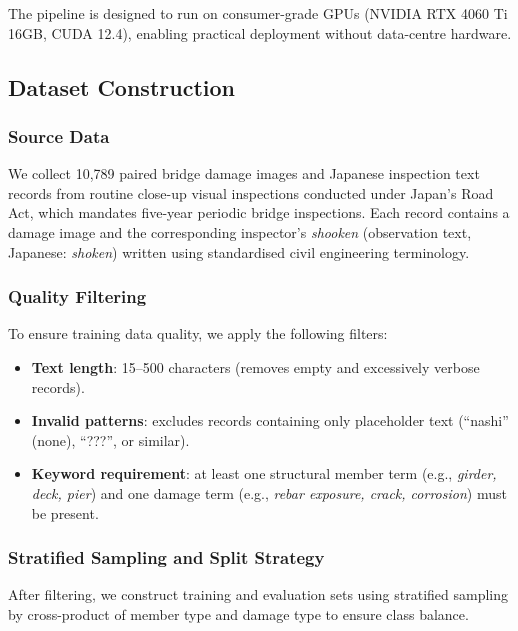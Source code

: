 \documentclass[twocolumn]{article}
\begin{document}
The pipeline is designed to run on consumer-grade GPUs (NVIDIA RTX 4060 Ti 16GB,
CUDA 12.4), enabling practical deployment without data-centre hardware.

\subsection{Dataset Construction}
\label{sec:dataset}

\subsubsection{Source Data}

We collect 10{,}789 paired bridge damage images and Japanese inspection text
records from routine close-up visual inspections conducted under Japan's Road
Act, which mandates five-year periodic bridge inspections.
Each record contains a damage image and the corresponding inspector's \emph{shooken}
(observation text, Japanese: \textit{shoken}) written using standardised civil engineering terminology.

\subsubsection{Quality Filtering}

To ensure training data quality, we apply the following filters:
\begin{itemize}[leftmargin=*,itemsep=1pt]
  \item \textbf{Text length}: 15--500 characters (removes empty and excessively
        verbose records).
  \item \textbf{Invalid patterns}: excludes records containing only placeholder
        text (``nashi'' (none), ``???'', or similar).
  \item \textbf{Keyword requirement}: at least one structural member term
        (e.g., \textit{girder, deck, pier}) and one damage term
        (e.g., \textit{rebar exposure, crack, corrosion}) must be present.
\end{itemize}

\subsubsection{Stratified Sampling and Split Strategy}

After filtering, we construct training and evaluation sets using stratified
sampling by cross-product of member type and damage type to ensure class balance.
\end{document}
